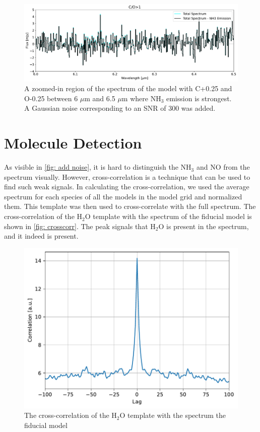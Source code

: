 \documentclass[twoside, single, authoryear, semicolon]{lion-msc}
\newcommand{\4}{$_4$}
\newcommand{\3}{$_3$}
\newcommand{\2}{$_2$}
\begin{document}
\begin{figure}[!ht]
    \centering
    \includegraphics[width=\linewidth]{Figures/AddNoise.pdf}
    \caption{A zoomed-in region of the spectrum of the model with C+0.25 and O-0.25 between 6 $\mu$m and 6.5 $\mu$m where NH\3 emission is strongest. A Gaussian noise corresponding to an SNR of 300 was added.}
    \label{fig: add noise}
\end{figure}

\section{Molecule Detection}
As visible in \autoref{fig: add noise}, it is hard to distinguish the NH\3 and NO from the spectrum visually. However, cross-correlation is a technique that can be used to find such weak signals. In calculating the cross-correlation, we used the average spectrum for each species of all the models in the model grid and normalized them. This template was then used to cross-correlate with the full spectrum. The cross-correlation of the H\2O template with the spectrum of the fiducial model is shown in \autoref{fig: crosscorr}. The peak signals that H\2O is present in the spectrum, and it indeed is present. 

\begin{figure}[!ht]
    \centering
    \includegraphics[width=.6\linewidth]{Figures/Cross-Correlation.pdf}
    \caption{The cross-correlation of the H\2O template with the spectrum the fiducial model}
    \label{fig: crosscorr}
\end{figure}
\end{document}

